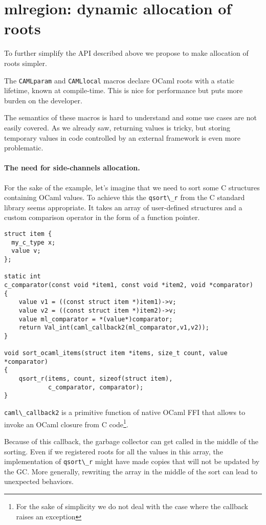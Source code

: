 \documentclass[a4paper]{easychair}
\newcommand{\cpp}[1]{\lstinline[style=C++]{#1}}
\begin{document}
\section{mlregion: dynamic allocation of roots}

To further simplify the API described above we propose to make
allocation of roots simpler.

The \cpp{CAMLparam} and \cpp{CAMLlocal} macros declare OCaml roots
with a static lifetime, known at compile-time. This is nice for
performance but puts more burden on the developer.

The semantics of these macros is hard to understand and some use cases
are not easily covered. As we already saw, returning values is tricky,
but storing temporary values in code controlled by an external framework
is even more problematic.

\paragraph{The need for side-channels allocation.}

For the sake of the example, let's imagine that we need to sort some C
structures containing OCaml values. To achieve this the
\cpp{qsort\_r} from the C standard library seems appropriate. It
takes an array of user-defined structures and a custom comparison
operator in the form of a function pointer.
%
\begin{lstlisting}[style=C++]
struct item {
  my_c_type x;
  value v;
};

static int
c_comparator(const void *item1, const void *item2, void *comparator)
{
    value v1 = ((const struct item *)item1)->v;
    value v2 = ((const struct item *)item2)->v;
    value ml_comparator = *(value*)comparator;
    return Val_int(caml_callback2(ml_comparator,v1,v2));
}

void sort_ocaml_items(struct item *items, size_t count, value *comparator)
{
    qsort_r(items, count, sizeof(struct item),
            c_comparator, comparator);
}
\end{lstlisting}

\cpp{caml\_callback2} is a primitive function of native OCaml FFI
that allows to invoke an OCaml closure from C code\footnote{For the sake of
simplicity we do not deal with the case where the callback raises an
exception}.

Because of this callback, the garbage collector can get called in the
middle of the sorting. Even if we registered roots for all the values
in this array, the implementation of \cpp{qsort\_r} might have made
copies that will not be updated by the GC. More generally, rewriting
the array in the middle of the sort can lead to unexpected behaviors.
\end{document}
